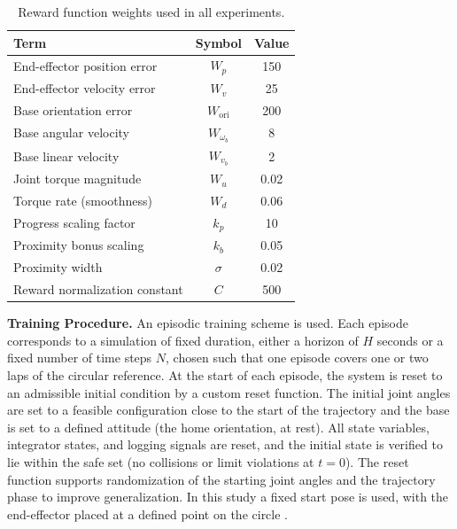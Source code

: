 \documentclass{ieeeaccess}
\begin{document}
\begin{table}[!b]
\centering
\caption{Reward function weights used in all experiments.}
\label{tab:reward_weights}
\begin{tabular}{lcc}
\toprule
\textbf{Term} & \textbf{Symbol} & \textbf{Value} \\
\midrule
End-effector position error      & $W_p$              & 150   \\
End-effector velocity error      & $W_v$              & 25    \\
Base orientation error           & $W_{\text{ori}}$   & 200   \\
Base angular velocity            & $W_{\omega_b}$     & 8     \\
Base linear velocity             & $W_{v_b}$          & 2     \\
Joint torque magnitude           & $W_u$              & 0.02  \\
Torque rate (smoothness)         & $W_d$              & 0.06  \\
Progress scaling factor          & $k_p$              & 10    \\
Proximity bonus scaling          & $k_b$              & 0.05  \\
Proximity width                  & $\sigma$           & 0.02  \\
Reward normalization constant    & $C$                & 500   \\
\bottomrule
\end{tabular}
\end{table}

\textbf{Training Procedure.} An episodic training scheme is used. Each episode corresponds to a
simulation of fixed duration, either a horizon of $H$ seconds or a fixed number
of time steps $N$, chosen such that
one episode covers one or two laps of the circular reference. At the start
of each episode, the system is reset to an admissible initial condition by a
custom reset function. The initial joint angles are set to a feasible configuration close
to the start of the trajectory and the base is set to a defined
attitude (the home orientation, at rest). All state variables, integrator states, and logging signals
are reset, and the initial state is verified to lie within the safe set
(no collisions or limit violations at $t = 0$). The reset function supports randomization
of the starting joint angles and the trajectory phase to improve generalization. In this
study a fixed start pose is used, with the end-effector placed at a defined
point on the circle \cite{b7}.
\end{document}
